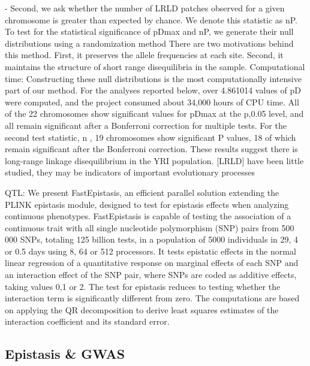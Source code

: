 -	Second, we ask whether the number of LRLD patches observed for a given chromosome is greater than expected by chance. We denote this statistic as nP. \cite{koch2013long}
To test for the statistical significance of pDmax and nP, we generate their null distributions using a randomization method \cite{koch2013long}
There are two motivations behind this method. First, it preserves the allele frequencies at each site. Second, it maintains the structure of short range disequilibria in the sample.  \cite{koch2013long}
Computational time: Constructing these null distributions is the most computationally intensive part of our method. For the analyses reported below, over 4.861014 values of pD were computed, and the project consumed about 34,000 hours of CPU time. \cite{koch2013long}
All of the 22 chromosomes show significant values for pDmax at the p,0.05 level, and all remain significant after a Bonferroni correction for multiple tests. For the second test statistic, n , 19 chromosomes show significant P values, 18 of which remain significant after the Bonferroni correction. These results suggest there is long-range linkage disequilibrium in the YRI population. \cite{koch2013long}
[LRLD] have been little studied, they may be indicators of important evolutionary processes \cite{koch2013long}

QTL: We present FastEpistasis, an efficient parallel solution extending the PLINK epistasis module, designed to test for epistasis effects when analyzing continuous phenotypes. \cite{schupbach2010fastepistasis}
FastEpistasis is capable of testing the association of a continuous trait with all single nucleotide polymorphism (SNP) pairs from 500 000 SNPs, totaling 125 billion tests, in a population of 5000 individuals in 29, 4 or 0.5 days using 8, 64 or 512 processors. \cite{schupbach2010fastepistasis}
It tests epistatic effects in the normal linear regression of a quantitative response on marginal effects of each SNP and an interaction effect of the SNP pair, where SNPs are coded as additive effects, taking values 0,1 or 2. The test for epistasis reduces to testing whether the interaction term is significantly different from zero. \cite{schupbach2010fastepistasis}
The computations are based on applying the QR decomposition to derive least squares estimates of the interaction coefficient and its standard error.  \cite{schupbach2010fastepistasis}


\subsection{Epistasis \& GWAS}


